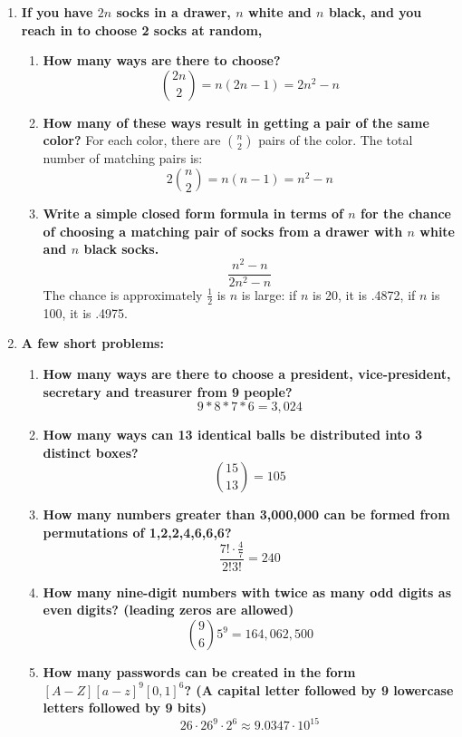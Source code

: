 \documentclass[12pt]{amsart}
\begin{document}
\begin{enumerate}
\begin{enumerate}
\end{enumerate}

\medskip

\item {\bf If you have $2n$ socks in a drawer, $n$ white and $n$ black, and you reach in to choose 2 socks at random,}
\begin{enumerate}
\item {\bf How many ways are there to choose?}
$$
{2n \choose 2} = n(2n-1) = 2n^2 - n
$$
\item {\bf How many of these ways result in getting a pair of the same color?}
For each color, there are $n \choose 2$ pairs of the color.  The total number of matching pairs is:
$$
2{n \choose 2} = n(n-1) = n^2 - n
$$

\item {\bf Write a simple closed form formula in terms of $n$ for the chance of choosing a matching pair of socks from a drawer with $n$ white and $n$ black socks.}
$$
\frac{n^2 - n}{2n^2 - n}
$$
The chance is approximately $\frac{1}{2}$ is $n$ is large: if $n$ is 20, it is .4872, if $n$ is 100, it is .4975.

\end{enumerate}

\medskip

\item {\bf A few short problems:}
\begin{enumerate}
\item {\bf How many ways are there to choose a president, vice-president, secretary and treasurer from 9 people?}
$$9*8*7*6 = 3,024$$

\item {\bf How many ways can 13 identical balls be distributed into 3 distinct boxes?}
$$
{15 \choose 13} = 105
$$
\item {\bf How many numbers greater than 3,000,000 can be formed from permutations of 1,2,2,4,6,6,6?}
$$
\frac{7!\cdot \frac{4}{7}}{2!3!} = 240
$$
\item {\bf How many nine-digit numbers with twice as many odd digits as even digits? (leading zeros are allowed)}
$$
{9 \choose 6}5^9 = 164,062,500
$$
\item {\bf How many passwords can be created in the form $[A-Z][a-z]^9[0,1]^6$? (A capital letter followed by 9 lowercase letters followed by 9 bits)}
$$
26 \cdot 26^9 \cdot 2^6 \approx 9.0347 \cdot 10^15
$$
\end{enumerate}

\medskip


\end{enumerate}
\end{document}
